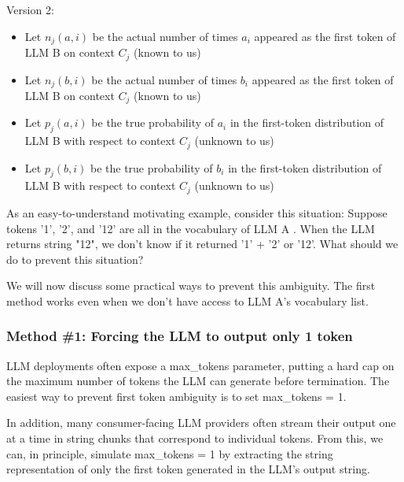 \documentclass{article}
\begin{document}
Version 2:
\begin{itemize}
\item Let $\displaystyle n_{j}( a,i)$ be the actual number of times $\displaystyle a_{i}$ appeared as the first token of LLM B on context $\displaystyle C_{j}$ (known to us)
\item Let $\displaystyle n_{j}( b,i)$ be the actual number of times $\displaystyle b_{i}$ appeared as the first token of LLM B on context $\displaystyle C_{j}$ (known to us)
\item Let $\displaystyle p_{j}( a,i)$ be the true probability of $\displaystyle a_{i}$ in the first-token distribution of LLM B with respect to context $\displaystyle C_{j}$ (unknown to us)
\item Let $\displaystyle p_{j}( b,i)$ be the true probability of $\displaystyle b_{i}$ in the first-token distribution of LLM B with respect to context $\displaystyle C_{j}$ (unknown to us)
\end{itemize}



As an easy-to-understand motivating example, consider this situation: Suppose tokens '1', '2', and '12' are all in the vocabulary of LLM A . When the LLM returns string "12", we don't know if it returned '1' + '2' or '12'. What should we do to prevent this situation?



We will now discuss some practical ways to prevent this ambiguity. The first method works even when we don't have access to LLM A's vocabulary list.



\subsubsection{Method \#1: Forcing the LLM to output only 1 token}

LLM deployments often expose a max\_tokens parameter, putting a hard cap on the maximum number of tokens the LLM can generate before termination. The easiest way to prevent first token ambiguity is to set max\_tokens = 1.



In addition, many consumer-facing LLM providers often stream their output one at a time in string chunks that correspond to individual tokens. From this, we can, in principle, simulate max\_tokens = 1 by extracting the string representation of only the first token generated in the LLM's output string.
\end{document}
